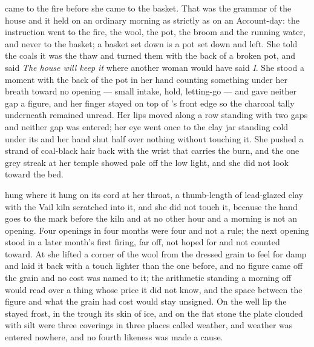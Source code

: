  came to the fire before she came to the basket. That was the grammar of the house and it held on an ordinary morning as strictly as on an Account-day: the instruction went to the fire, the wool, the pot, the broom and the running water, and never to the basket; a basket set down is a pot set down and left. She told the coals it was the thaw and turned them with the back of a broken pot, and said \emph{The house will keep it} where another woman would have said \emph{I}. She stood a moment with the back of the pot in her hand counting something under her breath toward no opening --- small intake, hold, letting-go --- and gave neither gap a figure, and her finger stayed on top of 's front edge so the charcoal tally underneath remained unread. Her lips moved along a row standing with two gaps and neither gap was entered; her eye went once to the clay jar standing cold under its  and her hand shut half over nothing without touching it. She pushed a strand of coal-black hair back with the wrist that carries the burn, and the one grey streak at her temple showed pale off the low light, and she did not look toward the bed.

 hung where it hung on its cord at her throat, a thumb-length of lead-glazed clay with the Vail kiln scratched into it, and she did not touch it, because the hand goes to the mark before the kiln and at no other hour and a morning is not an opening. Four openings in four months were four and not a rule; the next opening stood in a later month's first firing, far off, not hoped for and not counted toward. At  she lifted a corner of the wool from the dressed grain to feel for damp and laid it back with a touch lighter than the one before, and no figure came off the grain and no cost was named to it; the arithmetic standing a morning off would read over a thing whose price it did not know, and the space between the figure and what the grain had cost would stay unsigned. On the well lip the stayed frost, in the trough its skin of ice, and on the flat stone the plate clouded with silt were three coverings in three places called weather, and weather was entered nowhere, and no fourth likeness was made a cause.

\scenebreak

